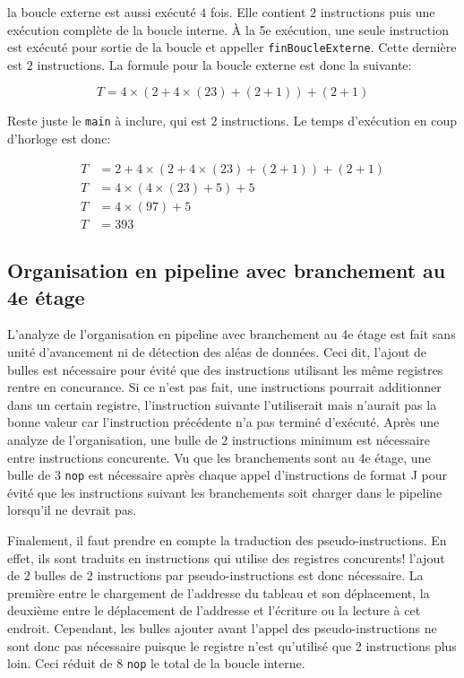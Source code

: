 \documentclass[a11paper]{article}
\newcommand{\todo}[1]{\begin{color}{Red}\textbf{TODO:} #1\end{color}}
\begin{document}
la boucle externe est aussi exécuté $4$ fois. Elle contient $2$ instructions
puis une exécution complète de la boucle interne. À la 5e exécution, une
seule instruction est exécuté pour sortie de la boucle et appeller
\verb|finBoucleExterne|. Cette dernière est $2$ instructions. La formule pour
la boucle externe est donc la suivante:

\begin{equation}
T = 4\times(2+4\times(23)+(2+1)) + (2+1)
\end{equation}

Reste juste le \verb|main| à inclure, qui est $2$ instructions. Le temps
d'exécution en coup d'horloge est donc:

\begin{align}
  T &= 2+ 4\times(2+4\times(23)+(2+1)) + (2+1) \\
  T &= 4\times(4\times(23)+5) + 5 \\
  T &= 4\times(97) + 5 \\
  T &= 393
\end{align}

\subsection{Organisation en pipeline avec branchement au 4e étage}


L'analyze de l'organisation en pipeline avec branchement au 4e étage est fait
sans unité d'avancement ni de détection des aléas de données. Ceci dit,
l'ajout de bulles est nécessaire pour évité que des instructions utilisant
les même registres rentre en concurance. Si ce n'est pas fait, une
instructions pourrait additionner dans un certain registre, l'instruction
suivante l'utiliserait mais n'aurait pas la bonne valeur car l'instruction
précédente n'a pas terminé d'exécuté. Après une analyze de l'organisation,
une bulle de $2$ instructions minimum est nécessaire entre instructions
concurente. Vu que les branchements sont au 4e étage, une bulle de $3$
\verb|nop| est nécessaire après chaque appel d'instructions de format J pour
évité que les instructions suivant les branchements soit charger dans le
pipeline lorsqu'il ne devrait pas.

Finalement, il faut prendre en compte la traduction des pseudo-instructions.
En effet, ils sont traduits en instructions qui utilise des registres
concurents! l'ajout de 2 bulles de $2$ instructions par pseudo-instructions
est donc nécessaire. La première entre le chargement de l'addresse du tableau
et son déplacement, la deuxième entre le déplacement de l'addresse et
l'écriture ou la lecture à cet endroit. Cependant, les bulles ajouter avant
l'appel des pseudo-instructions ne sont donc pas nécessaire puisque le
registre n'est qu'utilisé que 2 instructions plus loin. Ceci réduit de 8
\verb|nop| le total de la boucle interne.
\end{document}
